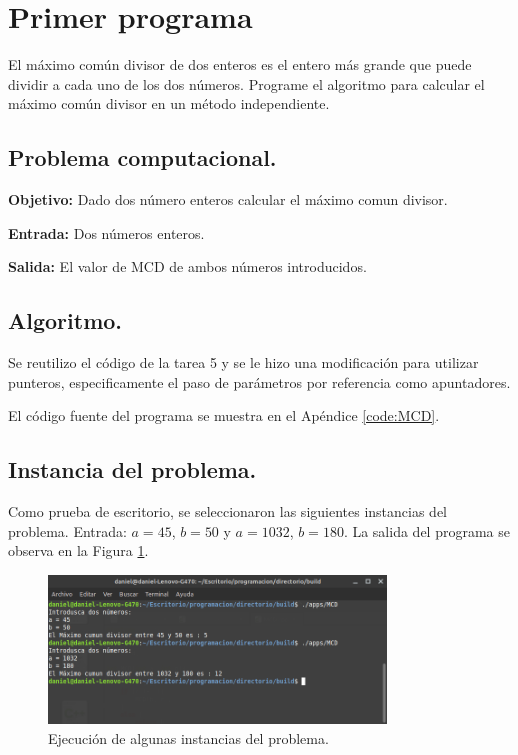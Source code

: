 \documentclass[12pt,letterpaper]{article}
\begin{document}
\newpage

\section{Primer programa}
El m\'aximo com\'un divisor de dos enteros es el entero m\'as grande que puede dividir a cada uno de los dos n\'umeros. Programe el algoritmo para calcular el m\'aximo com\'un divisor en un m\'etodo independiente.

\subsection{Problema computacional.}
\textbf{Objetivo:} Dado dos n\'umero enteros calcular el m\'aximo comun divisor.

\textbf{Entrada:} Dos n\'umeros enteros.

\textbf{Salida:} El valor de MCD de ambos n\'umeros introducidos.

\subsection{Algoritmo.}
Se reutilizo el c\'odigo de la tarea 5 y se le hizo una modificaci\'on para utilizar punteros, especificamente el paso de par\'ametros por referencia como apuntadores.

El código fuente del programa se muestra en el Apéndice \ref{code:MCD}.
\subsection{Instancia del problema.}
Como prueba de escritorio, se seleccionaron las siguientes instancias del problema. Entrada: $a=45 $, $b=50$ y $a=1032$, $b=180$. La salida del programa se observa en la Figura \ref{fig:MCD}.
\begin{figure}[ht!]
  \centering
  \includegraphics[width=0.8\textwidth]{figures/MCD}
  \caption{Ejecución de algunas instancias del problema.}
  \label{fig:MCD}
\end{figure}
\newpage
\end{document}
